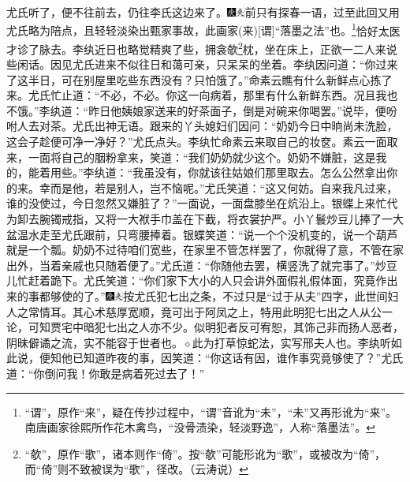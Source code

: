 尤氏听了，便不往前去，仍往李氏这边来了。{\includegraphics[width=3mm]{../Images/00004}\includegraphics[width=3mm]{../Images/00012}\footnotesize \kaishu 前只有探春一语，过至此回又用尤氏略为陪点，且轻轻淡染出甄家事故，此画家{(来)}{[}谓{]}“落墨之法”也。}\footnote{“谓”，原作“来”，疑在传抄过程中，“谓”音讹为“未”，“未”又再形讹为“来”。南唐画家徐熙所作花木禽鸟，“没骨渍染，轻淡野逸”，人称“落墨法”。}恰好太医才诊了脉去。李纨近日也略觉精爽了些，拥衾欹\footnote{“欹”，原作“歌”，诸本则作“倚”。按“欹”可能形讹为“歌”，或被改为“倚”，而“倚”则不致被误为“歌”，径改。（云涛说）}枕，坐在床上，正欲一二人来说些闲话。因见尤氏进来不似往日和蔼可亲，只呆呆的坐着。李纨因问道：“你过来了这半日，可在别屋里吃些东西没有？只怕饿了。”命素云瞧有什么新鲜点心拣了来。尤氏忙止道：“不必，不必。你这一向病着，那里有什么新鲜东西。况且我也不饿。”李纨道：“昨日他姨娘家送来的好茶面子，倒是对碗来你喝罢。”说毕，便吩咐人去对茶。尤氏出神无语。跟来的丫头媳妇们因问：“奶奶今日中晌尚未洗脸，这会子趁便可净一净好？”尤氏点头。李纨忙命素云来取自己的妆奁。素云一面取来，一面将自己的胭粉拿来，笑道：“我们奶奶就少这个。奶奶不嫌脏，这是我的，能着用些。”李纨道：“我虽没有，你就该往姑娘们那里取去。怎么公然拿出你的来。幸而是他，若是别人，岂不恼呢。”尤氏笑道：“这又何妨。自来我凡过来，谁的没使过，今日忽然又嫌脏了？”一面说，一面盘膝坐在炕沿上。银蝶上来忙代为卸去腕镯戒指，又将一大袱手巾盖在下截，将衣裳护严。小丫鬟炒豆儿捧了一大盆温水走至尤氏跟前，只弯腰捧着。银蝶笑道：“说一个个没机变的，说一个葫芦就是一个瓢。奶奶不过待咱们宽些，在家里不管怎样罢了，你就得了意，不管在家出外，当着亲戚也只随着便了。”尤氏道：“你随他去罢，横竖洗了就完事了。”炒豆儿忙赶着跪下。尤氏笑道：“你们家下大小的人只会讲外面假礼假体面，究竟作出来的事都够使的了。”{\includegraphics[width=3mm]{../Images/00004}\includegraphics[width=3mm]{../Images/00012}\footnotesize \kaishu 按尤氏犯七出之条，不过只是“过于从夫”四字，此世间妇人之常情耳。其心术慈厚宽顺，竟可出于阿凤之上，特用此明犯七出之人从公一论，可知贾宅中暗犯七出之人亦不少。似明犯者反可宥恕，其饰己非而扬人恶者，阴昧僻谲之流，实不能容于世者也。{$\diamond$}此为打草惊蛇法，实写邢夫人也。}李纨听如此说，便知他已知道昨夜的事，因笑道：“你这话有因，谁作事究竟够使了？”尤氏道：“你倒问我！你敢是病着死过去了！”


